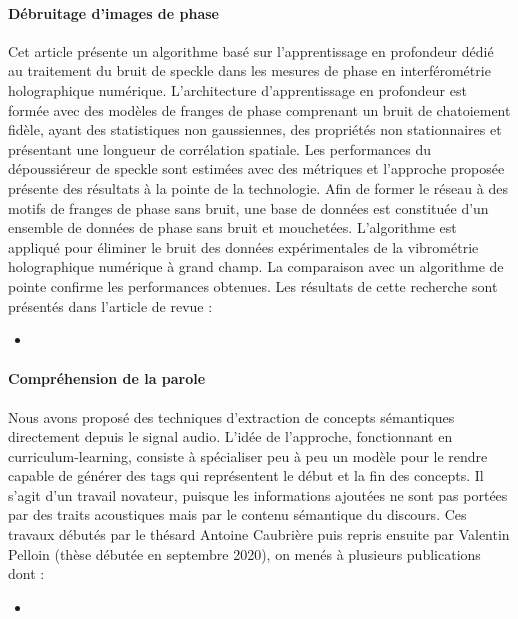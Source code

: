 \documentclass[11pt,a4paper]{article}
\begin{document}
\paragraph{Débruitage d'images de phase} Cet article présente un algorithme basé sur l'apprentissage en profondeur dédié au traitement du bruit de speckle dans les mesures de phase en interférométrie holographique numérique. L'architecture d'apprentissage en profondeur est formée avec des modèles de franges de phase comprenant un bruit de chatoiement fidèle, ayant des statistiques non gaussiennes, des propriétés non stationnaires et présentant une longueur de corrélation spatiale. Les performances du dépoussiéreur de speckle sont estimées avec des métriques et l'approche proposée présente des résultats à la pointe de la technologie. Afin de former le réseau à des motifs de franges de phase sans bruit, une base de données est constituée d'un ensemble de données de phase sans bruit et mouchetées. L'algorithme est appliqué pour éliminer le bruit des données expérimentales de la vibrométrie holographique numérique à grand champ. La comparaison avec un algorithme de pointe confirme les performances obtenues.
Les résultats de cette recherche sont présentés dans l'article de revue :

\begin{itemize}
 \item {} 
\end{itemize}

\paragraph{Compréhension de la parole} Nous avons proposé des techniques d'extraction de concepts sémantiques directement depuis le signal audio. L'idée de l'approche, fonctionnant en curriculum-learning, consiste à spécialiser peu à peu un modèle pour le rendre capable de générer des tags qui représentent le début et la fin des concepts. Il s'agit d'un travail novateur, puisque les informations ajoutées ne sont pas portées par des traits acoustiques mais par le contenu sémantique du discours. Ces travaux débutés par le thésard Antoine Caubrière puis repris ensuite par Valentin Pelloin (thèse débutée en septembre 2020), on menés à plusieurs publications dont :

\begin{itemize}
 \item {}
\end{itemize}
\end{document}
